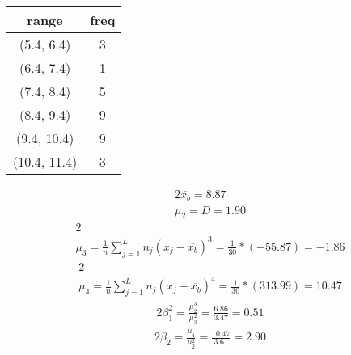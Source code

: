 \documentclass{article}%
\begin{document}
%
\normalsize%
\begin{tabular}{c|c}
\toprule
       range &  freq \\
\midrule
  (5.4, 6.4) &     3 \\
  (6.4, 7.4) &     1 \\
  (7.4, 8.4) &     5 \\
  (8.4, 9.4) &     9 \\
 (9.4, 10.4) &     9 \\
(10.4, 11.4) &     3 \\
\bottomrule
\end{tabular}
%
\begin{alignat*}{2}%
\overline {{ x_{{b}} }} = 8.87%
\\ \mu_2 = D = 1.90%
\end{alignat*}%
\begin{alignat*}{2}%
\\ \mu_3
            = \frac 1 n \sum\limits_{j = 1}^L {n_j (x_j - \overline {{ x_{{b}} }})^3}
            = \frac 1 { 30 } * (-55.87)
            = -1.86
\end{alignat*}%
\begin{alignat*}{2}%
\\ \mu_4
            = \frac 1 n \sum\limits_{j = 1}^L {n_j (x_j - \overline {{ x_{{b}} }})^4}
            = \frac 1 { 30 } * (313.99)
            = 10.47
\end{alignat*}%
\begin{alignat*}{2}%
\beta_1^2
            = \frac {\mu_2^3} {\mu_3^2}
            = \frac {6.86} {3.47}
            = 0.51
\end{alignat*}%
\begin{alignat*}{2}%
\beta_2
            = \frac {\mu_4} {\mu_2^2}
            = \frac {10.47} {3.61}
            = 2.90
\end{alignat*}%
\end{document}

